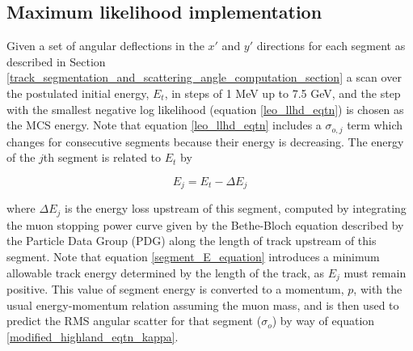 \documentclass[a4paper,11pt]{article}
\begin{document}











\subsection{Maximum likelihood implementation}\label{maximum_likelihood_section}

Given a set of angular deflections in the $x'$ and $y'$ directions for each segment as described in Section \ref{track_segmentation_and_scattering_angle_computation_section} a scan over the postulated initial energy, $E_t$, in steps of 1 MeV up to 7.5 GeV, and the step with the smallest negative log likelihood (equation \ref{leo_llhd_eqtn}) is chosen as the MCS energy. Note that equation \ref{leo_llhd_eqtn} includes a $\sigma_{o,j}$ term which changes for consecutive segments because their energy is decreasing. The energy of the $j$th segment is related to $E_t$ by

\begin{equation}\label{segment_E_equation}
E_{j} = E_t - \Delta E_{j}
\end{equation}

where $\Delta E_{j}$ is the energy loss upstream of this segment, computed by integrating the muon stopping power curve given by the Bethe-Bloch equation described by the Particle Data Group (PDG) \cite{stoppingpowersource} along the length of track upstream of this segment. Note that equation \ref{segment_E_equation} introduces a minimum allowable track energy determined by the length of the track, as $E_{j}$ must remain positive. This value of segment energy is converted to a momentum, $p$, with the usual energy-momentum relation assuming the muon mass, and is then used to predict the RMS angular scatter for that segment ($\sigma_o$) by way of equation \ref{modified_highland_eqtn_kappa}. 
\end{document}
